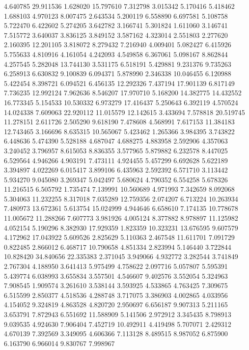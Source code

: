 4.640785
29.911536
1.628020
15.797610
7.312798
3.015342
5.170416
5.418462
1.688103
4.970123
8.007475
2.643534
5.200119
6.558890
6.697581
5.108758
5.722470
6.422602
5.274205
3.642782
3.166741
5.301824
1.611060
3.146741
7.515772
3.640037
3.836125
3.849152
3.587162
4.323014
2.551803
2.277620
2.160395
12.201105
3.818072
8.279432
7.216940
4.009401
5.082427
6.415926
5.755633
4.810916
4.161054
4.242093
4.549858
6.367061
5.098167
8.862844
4.257545
5.282048
13.744130
3.531175
6.518191
5.429881
9.231376
9.735263
6.258913
6.630832
9.100839
6.094371
5.878990
2.346338
10.046455
6.120988
5.422454
8.398721
6.094521
6.456135
12.292326
7.437194
17.901139
6.817149
7.736235
12.992124
7.962636
8.546207
17.970710
5.168200
14.382775
14.432552
16.773345
5.154533
10.530332
6.973279
17.416437
5.250643
6.392119
4.570524
14.024338
7.609063
22.920112
11.015579
12.142615
3.433694
7.578818
20.519745
11.278151
2.611726
2.505290
9.618190
7.478608
4.568991
7.617153
11.384183
12.743465
3.166696
8.635315
10.565067
5.423462
1.265366
3.984395
3.743822
6.448636
5.474390
5.528188
4.687047
4.688275
4.883958
2.592906
4.357063
3.240452
3.796957
8.615053
8.836355
3.577965
5.879882
6.232578
8.447025
6.529564
4.946266
4.903191
7.473111
4.924455
5.457299
6.692628
5.622189
3.394897
4.022269
6.015417
3.899106
6.435963
2.592392
6.571710
3.113442
5.934270
9.045080
3.269347
5.042497
5.680624
4.790352
6.554258
5.678326
11.216515
6.505792
1.735474
7.139991
10.560689
4.971993
7.342659
8.092068
5.304063
11.232255
8.317018
7.035289
12.759356
2.074207
6.713224
10.263934
7.480973
13.672361
5.613754
15.024999
4.944646
6.658610
7.174135
10.778678
11.005672
11.288266
7.607773
3.981926
4.005124
8.377882
8.978897
11.125982
4.052154
5.190296
8.382930
17.929359
1.823359
10.323231
13.676595
9.607579
4.172962
17.043922
5.609526
2.825629
5.110363
2.467548
11.611701
7.091729
0.822485
2.866012
6.468717
10.790658
4.851334
2.823994
5.146440
3.722844
10.828420
34.840656
22.335383
2.371045
3.949066
4.932772
3.282544
3.741849
2.767304
4.188950
3.641413
5.975499
4.758622
2.097716
5.057807
5.595391
5.439774
6.038993
3.655834
3.557501
4.546607
9.402576
3.552054
5.324963
7.908545
1.909574
3.261610
3.538144
3.593925
4.533865
4.763425
7.309675
6.515599
2.850377
4.518536
4.288748
3.717075
3.386903
4.002865
4.033956
4.154052
9.324819
4.863528
4.820720
2.950697
6.656187
9.907313
5.211165
3.653791
7.872943
6.551692
11.588909
5.141506
2.972912
3.345435
8.798913
9.039535
4.924630
7.906404
7.452719
10.492911
4.419498
5.707071
2.429312
4.670139
7.392569
3.349095
4.606366
7.113128
8.489515
8.987052
6.875900
6.163790
6.966014
9.830767
7.998967
